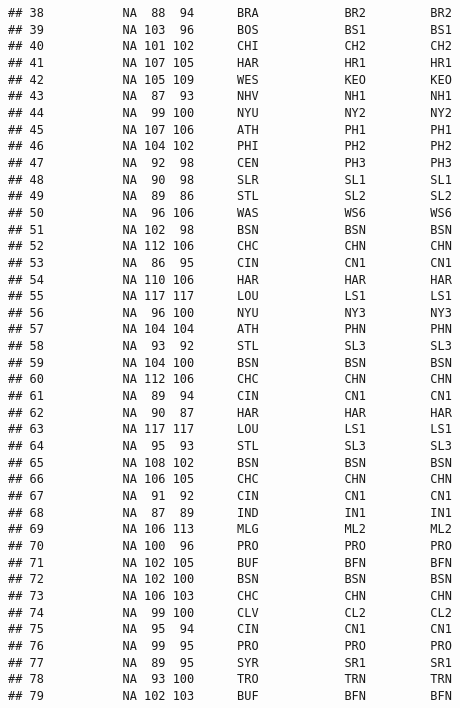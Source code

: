 \documentclass[]{article}
\begin{document}
\begin{verbatim}
## 38           NA  88  94      BRA            BR2         BR2
## 39           NA 103  96      BOS            BS1         BS1
## 40           NA 101 102      CHI            CH2         CH2
## 41           NA 107 105      HAR            HR1         HR1
## 42           NA 105 109      WES            KEO         KEO
## 43           NA  87  93      NHV            NH1         NH1
## 44           NA  99 100      NYU            NY2         NY2
## 45           NA 107 106      ATH            PH1         PH1
## 46           NA 104 102      PHI            PH2         PH2
## 47           NA  92  98      CEN            PH3         PH3
## 48           NA  90  98      SLR            SL1         SL1
## 49           NA  89  86      STL            SL2         SL2
## 50           NA  96 106      WAS            WS6         WS6
## 51           NA 102  98      BSN            BSN         BSN
## 52           NA 112 106      CHC            CHN         CHN
## 53           NA  86  95      CIN            CN1         CN1
## 54           NA 110 106      HAR            HAR         HAR
## 55           NA 117 117      LOU            LS1         LS1
## 56           NA  96 100      NYU            NY3         NY3
## 57           NA 104 104      ATH            PHN         PHN
## 58           NA  93  92      STL            SL3         SL3
## 59           NA 104 100      BSN            BSN         BSN
## 60           NA 112 106      CHC            CHN         CHN
## 61           NA  89  94      CIN            CN1         CN1
## 62           NA  90  87      HAR            HAR         HAR
## 63           NA 117 117      LOU            LS1         LS1
## 64           NA  95  93      STL            SL3         SL3
## 65           NA 108 102      BSN            BSN         BSN
## 66           NA 106 105      CHC            CHN         CHN
## 67           NA  91  92      CIN            CN1         CN1
## 68           NA  87  89      IND            IN1         IN1
## 69           NA 106 113      MLG            ML2         ML2
## 70           NA 100  96      PRO            PRO         PRO
## 71           NA 102 105      BUF            BFN         BFN
## 72           NA 102 100      BSN            BSN         BSN
## 73           NA 106 103      CHC            CHN         CHN
## 74           NA  99 100      CLV            CL2         CL2
## 75           NA  95  94      CIN            CN1         CN1
## 76           NA  99  95      PRO            PRO         PRO
## 77           NA  89  95      SYR            SR1         SR1
## 78           NA  93 100      TRO            TRN         TRN
## 79           NA 102 103      BUF            BFN         BFN

\end{verbatim}
\end{document}
